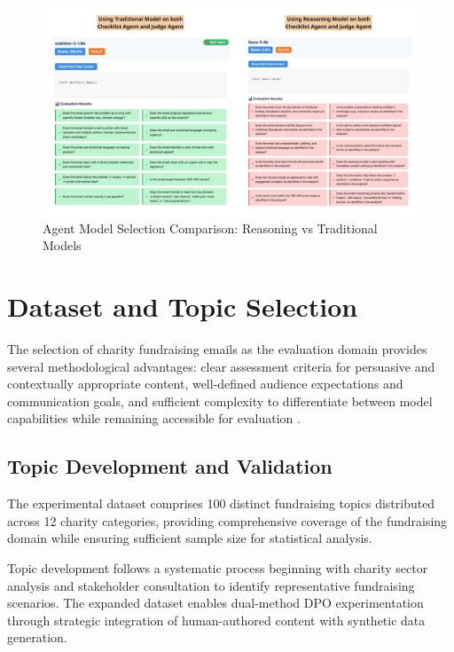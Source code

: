 
\begin{figure}[H]
    \centering
    \includegraphics[width=1.0\textwidth]{figures/traditional_vs_reasoning.png}
    \caption{Agent Model Selection Comparison: Reasoning vs Traditional Models}
    \label{fig:agent-model-selection}
\end{figure}

\section{Dataset and Topic Selection}
\label{sec:dataset-topic-selection}

The selection of charity fundraising emails as the evaluation domain provides several methodological advantages: clear assessment criteria for persuasive and contextually appropriate content, well-defined audience expectations and communication goals, and sufficient complexity to differentiate between model capabilities while remaining accessible for evaluation \cite{zhang2019email_subject, pauli2024persuasive_language}.

\subsection{Topic Development and Validation}

The experimental dataset comprises 100 distinct fundraising topics distributed across 12 charity categories, providing comprehensive coverage of the fundraising domain while ensuring sufficient sample size for statistical analysis.

Topic development follows a systematic process beginning with charity sector analysis and stakeholder consultation to identify representative fundraising scenarios. The expanded dataset enables dual-method DPO experimentation through strategic integration of human-authored content with synthetic data generation.

